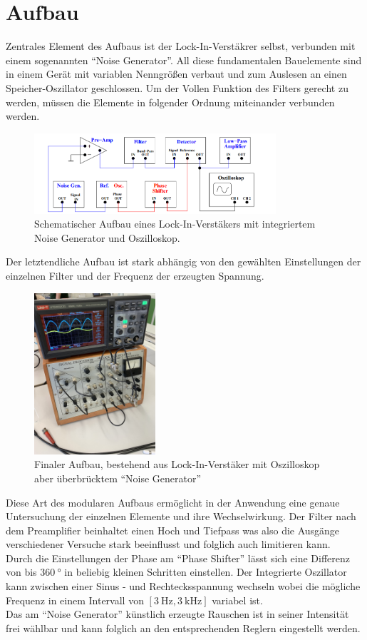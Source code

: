 \section{Aufbau}
Zentrales Element des Aufbaus ist der Lock-In-Verstäkrer selbst, verbunden mit einem sogenannten \enquote{Noise Generator}.
All diese fundamentalen Bauelemente sind in einem Gerät mit variablen Nenngrößen verbaut und zum Auslesen an einen Speicher-Oszillator geschlossen.
Um der Vollen Funktion des Filters gerecht zu werden, müssen die Elemente in folgender Ordnung miteinander verbunden werden.
\begin{figure}
    \centering
    \includegraphics[width=0.8\textwidth]{bilder/plan.png}
    \caption{Schematischer Aufbau eines Lock-In-Verstäkers mit integriertem Noise Generator und Oszilloskop. \cite{skript}} 
    \label{fig:plan}
\end{figure}
Der letztendliche Aufbau ist stark abhängig von den gewählten Einstellungen der einzelnen Filter und der Frequenz der erzeugten Spannung.
\begin{figure}
    \centering
    \includegraphics[width=0.4\textwidth]{bilder/RL.png}
    \caption{Finaler Aufbau, bestehend aus Lock-In-Verstäker mit Oszilloskop aber überbrücktem \enquote{Noise Generator}} 
    \label{fig:RL}
\end{figure}
Diese Art des modularen Aufbaus ermöglicht in der Anwendung eine genaue Untersuchung der einzelnen Elemente und ihre Wechselwirkung.
Der Filter nach dem Preamplifier beinhaltet einen Hoch und Tiefpass was also die Ausgänge verschiedener Versuche stark beeinflusst und folglich auch limitieren kann.
\\
Durch die Einstellungen der Phase am \enquote{Phase Shifter} lässt sich eine Differenz von bis $\SI{360}{\degree}$ in beliebig kleinen Schritten einstellen.
Der Integrierte Oszillator kann zwischen einer Sinus - und Rechtecksspannung wechseln wobei die mögliche Frequenz in einem Intervall von $[\SI{3}{\hertz}, \SI{3}{\kilo\hertz}]$ variabel ist.
\\
Das am \enquote{Noise Generator} künstlich erzeugte Rauschen ist in seiner Intensität frei wählbar und kann folglich an den entsprechenden Reglern eingestellt werden.


